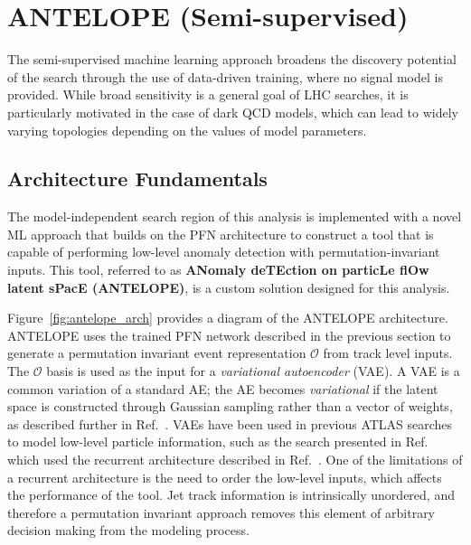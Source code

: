 \section{ANTELOPE (Semi-supervised)}
\label{subsec:unsupervised}

The semi-supervised machine learning approach broadens the discovery potential of the search through the use of data-driven training, where no signal model is provided.
While broad sensitivity is a general goal of LHC searches, it is particularly motivated in the case of dark QCD models, which can lead to widely varying topologies depending on the values of model parameters.

\subsection{Architecture Fundamentals}
The model-independent search region of this analysis is implemented with a novel ML approach that builds on the PFN architecture to construct a tool that is capable of performing low-level anomaly detection with permutation-invariant inputs.
This tool, referred to as \textbf{ANomaly deTEction on particLe flOw latent sPacE (ANTELOPE)}, is a custom solution designed for this analysis.

Figure~\ref{fig:antelope_arch} provides a diagram of the ANTELOPE architecture. ANTELOPE uses the trained PFN network described in the previous section to generate a permutation invariant event representation $\mathcal{O}$ from track level inputs. The $\mathcal{O}$ basis is used as the input for a \textit{variational autoencoder} (VAE). A VAE is a common variation of a standard AE; the AE becomes \textit{variational} if the latent space is constructed through Gaussian sampling rather than a vector of weights, as described further in Ref.~\cite{vae2}. VAEs have been used in previous ATLAS searches to model low-level particle information, such as the search presented in Ref.~\cite{yxh} which used the recurrent architecture described in Ref.~\cite{vrnn}. One of the limitations of a recurrent architecture is the need to order the low-level inputs, which affects the performance of the tool. Jet track information is intrinsically unordered, and therefore a permutation invariant approach removes this element of arbitrary decision making from the modeling process. 


